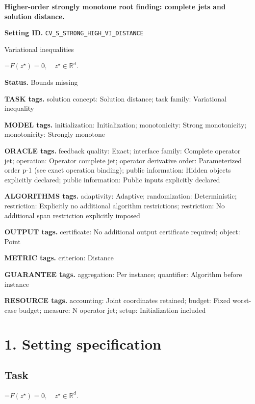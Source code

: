 \documentclass[10pt,a4paper]{article}
\newcommand{\AtlasMath}[1]{\par\begingroup\centering\setbox0=\hbox{$\displaystyle #1$}\ifdim\wd0>1.4\linewidth\typeout{ATLAS WIDE FORMULA: \the\wd0}\fi\ifdim\wd0>\linewidth\resizebox{\linewidth}{!}{\box0}\else\box0\fi\par\endgroup}
\begin{document}
\raggedright

{\LARGE\bfseries\sffamily\color{AtlasNavy} Higher-order strongly monotone root finding: complete jets and solution distance.\par}\vspace{5pt}
\textbf{Setting ID.} \texttt{CV\_\allowbreak{}S\_\allowbreak{}STRONG\_\allowbreak{}HIGH\_\allowbreak{}VI\_\allowbreak{}DISTANCE}

Variational inequalities


\AtlasMath{F(z^\star)=0,\quad z^\star\in\mathbb{R}^d.}


\textbf{Status.} Bounds missing

\textbf{TASK tags.} solution concept: Solution distance; task family: Variational inequality

\textbf{MODEL tags.} initialization: Initialization; monotonicity: Strong monotonicity; monotonicity: Strongly monotone

\textbf{ORACLE tags.} feedback quality: Exact; interface family: Complete operator jet; operation: Operator complete jet; operator derivative order: Parameterized order p-1 (see exact operation binding); public information: Hidden objects explicitly declared; public information: Public inputs explicitly declared

\textbf{ALGORITHMS tags.} adaptivity: Adaptive; randomization: Deterministic; restriction: Explicitly no additional algorithm restrictions; restriction: No additional span restriction explicitly imposed

\textbf{OUTPUT tags.} certificate: No additional output certificate required; object: Point

\textbf{METRIC tags.} criterion: Distance

\textbf{GUARANTEE tags.} aggregation: Per instance; quantifier: Algorithm before instance

\textbf{RESOURCE tags.} accounting: Joint coordinates retained; budget: Fixed worst-case budget; measure: N operator jet; setup: Initialization included

\section{1. Setting specification}
\subsection{Task}

\AtlasMath{F(z^\star)=0,\quad z^\star\in\mathbb{R}^d.}
\end{document}
